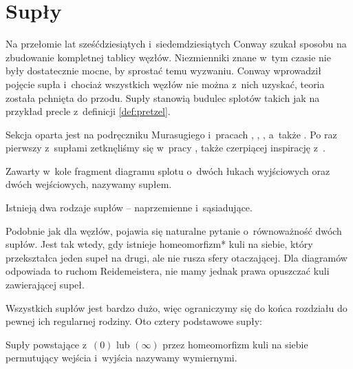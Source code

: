 \section{Supły} %
\label{sec:tangle}


Na przełomie lat sześćdziesiątych i~siedemdziesiątych Conway szukał sposobu na zbudowanie kompletnej tablicy węzłów.
Niezmienniki znane w~tym czasie nie były dostatecznie mocne, by sprostać temu wyzwaniu.
Conway wprowadził pojęcie supła i~chociaż wszystkich węzłów nie można z~nich uzyskać, teoria została pchnięta do przodu.
Supły stanowią budulec splotów takich jak na przykład precle z~definicji \ref{def:pretzel}.

Sekcja oparta jest na podręczniku Murasugiego \cite{murasugi96} i~pracach \cite{conway70}, \cite{kauffman97}, \cite{kauffman04}, a~także \cite{schubert56}.
Po raz pierwszy z~supłami zetknęliśmy się w~pracy \cite{janiak04}, także czerpiącej inspirację z~\cite{murasugi96}.

\begin{definition}[supeł]
    \label{def:tangle}
    Zawarty w~kole fragment diagramu splotu o~dwóch łukach wyjściowych oraz dwóch wejściowych, nazywamy supłem.
\end{definition}

Istnieją dwa rodzaje supłów -- naprzemienne i~sąsiadujące.


Podobnie jak dla węzłów, pojawia się naturalne pytanie o~równoważność dwóch supłów.
Jest tak wtedy, gdy istnieje homeomorfizm* kuli na siebie, który przekształca jeden supeł na drugi, ale nie rusza sfery otaczającej.
Dla diagramów odpowiada to ruchom Reidemeistera, nie mamy jednak prawa opuszczać kuli zawierającej supeł.

Wszystkich supłów jest bardzo dużo, więc ograniczymy się do końca rozdziału do pewnej ich regularnej rodziny.
Oto cztery podstawowe supły:


\begin{definition}
    \label{def:rational_tangle}
    Supły powstające z~$(0)$ lub $(\infty)$ przez homeomorfizm kuli na siebie permutujący wejścia i~wyjścia nazywamy wymiernymi.
\end{definition}


